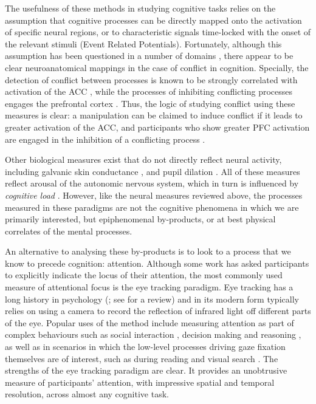 The usefulness of these methods in studying cognitive tasks
relies on the assumption that cognitive processes can be
directly mapped onto the activation of specific neural regions,
or to characteristic signals time-locked with the onset of the relevant stimuli 
(Event Related Potentials).
Fortunately, although this assumption
has been questioned in a number of domains \citep[see][]{Coltheart2013},
there appear to be clear neuroanatomical mappings
in the case of conflict in cognition.
Specially, the detection of conflict between processes
is known to be strongly correlated with activation of the ACC \citep{Botvinick2004},
while the processes of inhibiting conflicting processes
engages the prefrontal cortex \citep{Aron2004,Miller2001}.
Thus, the logic of studying conflict using these measures is clear:
a manipulation can be claimed to induce conflict
if it leads to greater activation of the ACC,
and participants who show greater PFC activation
are engaged in the inhibition of a conflicting process
\citep[see, i.e.][]{DeNeys2008}.

Other biological measures exist that
do not directly reflect neural activity,
including galvanic skin conductance \citep{DeNeys2010, Figner2010},
and pupil dilation \citep{Fiedler2012, Kahneman1966, Wang2011}.
All of these measures reflect arousal of the autonomic nervous system,
which in turn is influenced by \emph{cognitive load}
\citep{Kahneman1966}.
However, like the neural measures reviewed above,
the processes measured in these paradigms
are not the cognitive phenomena in which we are primarily interested,
but epiphenomenal by-products,
or at best physical correlates of the mental processes.

An alternative to analysing these by-products
is to look to a process that we know to precede cognition: attention.
Although some work \citep[i.e.][]{Evans1996a} has asked participants
to explicitly indicate the locus of their attention,
the most commonly used measure of attentional focus
is the eye tracking paradigm.
Eye tracking has a long history in psychology
(\citealp{Ball2014, Mele2012, Huey1908, Yarbus1967};
see \citealp{Duchowski2007} for a review)
and in its modern form typically relies on
using a camera to record the reflection of infrared light
off different parts of the eye.
Popular uses of the method include
measuring attention as part of complex behaviours
such as social interaction \citep[i.e.][]{Hanley2014},
decision making \citep{Krajbich2011}
and reasoning \citep{Ball2014},
as well as in scenarios in which the low-level processes
driving gaze fixation themselves are of interest,
such as during reading \citep{Rayner1998}
and visual search \citep{Treisman1980}.
The strengths of the eye tracking paradigm are clear.
It provides an unobtrusive measure of participants' attention,
with impressive spatial and temporal resolution,
across almost any cognitive task.

